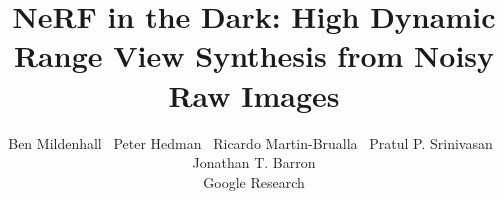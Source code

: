 \documentclass[10pt,twocolumn,letterpaper]{article}
\begin{document}
\title{NeRF in the Dark: High Dynamic Range View Synthesis from Noisy Raw Images}




\author{
\hspace{-5pt}
Ben Mildenhall
\;\,
Peter Hedman
\;\,
Ricardo Martin-Brualla
\;\,
Pratul P. Srinivasan
\;\,
Jonathan T. Barron
\\
\vspace{2mm}
{Google Research}
}
\maketitle



{\small


}


\appendix


\end{document}
